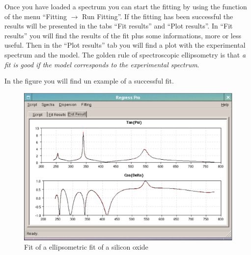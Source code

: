\documentclass[a4paper]{report}
\begin{document}
Once you have loaded a spectrum you can start the fitting by using the
function of the menu ``\textsf{Fitting $\rightarrow$ Run Fitting}''. If the
fitting has been successful the results will be presented in the tabs
``Fit results'' and ``Plot results''. In ``Fit results'' you will find
the results of the fit plus some informations, more or less
useful. Then in the ``Plot results'' tab you will find a plot with the
experimental spectrum and the model. The golden rule of spectroscopic
ellipsometry is that \emph{a fit is good if the model corresponds to
the experimental spectrum}.

In the figure you will find un example of a successful fit.
\begin{figure}[!thp]
  \includegraphics[width=\textwidth]{figure/oxide-fit-1.eps}
  \caption{Fit of a ellipsometric fit of a silicon oxide}
\end{figure}
\end{document}
